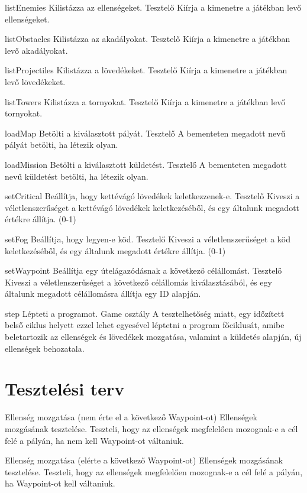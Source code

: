 \usecase
{listEnemies}
{Kilistázza az ellenségeket.}
{Tesztelő}
{Kiírja a kimenetre a játékban levő ellenségeket.}

\usecase
{listObstacles}
{Kilistázza az akadályokat.}
{Tesztelő}
{Kiírja a kimenetre a játékban levő akadályokat.}

\usecase
{listProjectiles}
{Kilistázza a lövedékeket.}
{Tesztelő}
{Kiírja a kimenetre a játékban levő lövedékeket.}

\usecase
{listTowers}
{Kilistázza a tornyokat.}
{Tesztelő}
{Kiírja a kimenetre a játékban levő tornyokat.}

\usecase
{loadMap}
{Betölti a kiválasztott pályát.}
{Tesztelő}
{A bementeten megadott nevű pályát betölti, ha létezik olyan.}

\usecase
{loadMission}
{Betölti a kiválasztott küldetést.}
{Tesztelő}
{A bementeten megadott nevű küldetést betölti, ha létezik olyan.}

\usecase
{setCritical}
{Beállítja, hogy kettévágó lövedékek keletkezzenek-e.}
{Tesztelő}
{Kiveszi a véletlenszerűséget a kettévágó lövedékek keletkezéséből, és egy általunk megadott értékre állítja. (0-1)}

\usecase
{setFog}
{Beállítja, hogy legyen-e köd.}
{Tesztelő}
{Kiveszi a véletlenszerűséget a köd keletkezéséből, és egy általunk megadott értékre állítja. (0-1)}

\usecase
{setWaypoint}
{Beállítja egy útelágazódásnak a következő célállomást.}
{Tesztelő}
{Kiveszi a véletlenszerűséget a következő célállomás kiválasztásából, és egy általunk megadott célállomásra állítja egy ID alapján.}

\usecase
{step}
{Lépteti a programot.}
{Game osztály}
{A tesztelhetőség miatt, egy időzített belső ciklus helyett ezzel lehet egyesével léptetni a program főciklusát,
 amibe beletartozik az ellenségek és lövedékek mozgatása, valamint a küldetés alapján, új ellenségek behozatala.}

\section{Tesztelési terv}

\teszteset
{Ellenség mozgatása (nem érte el a következő Waypoint-ot)} %
{Ellenségek mozgásának tesztelése.} %
{Teszteli, hogy az ellenségek megfelelően mozognak-e a cél felé a pályán, ha nem kell Waypoint-ot váltaniuk.} %

\teszteset
{Ellenség mozgatása (elérte a következő Waypoint-ot)}
{Ellenségek mozgásának tesztelése.}
{Teszteli, hogy az ellenségek megfelelően mozognak-e a cél felé a pályán, ha Waypoint-ot kell váltaniuk.}

